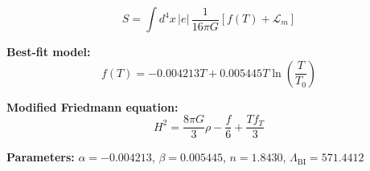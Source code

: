 
\begin{equation}
  S = \int d^4x \, |e| \, \frac{1}{16\pi G} \left[ f(T) + \mathcal{L}_m \right]
\end{equation}

\textbf{Best-fit model:}
\begin{equation}
  f(T) = -0.004213 T + 0.005445 T \ln\!\left(\frac{T}{T_0}\right)
\end{equation}

\textbf{Modified Friedmann equation:}
\begin{equation}
  H^2 = \frac{8\pi G}{3} \rho - \frac{f}{6} + \frac{T f_T}{3}
\end{equation}

\textbf{Parameters:}
$\alpha = -0.004213$, \quad
$\beta = 0.005445$, \quad
$n = 1.8430$, \quad
$\Lambda_{\text{BI}} = 571.4412$